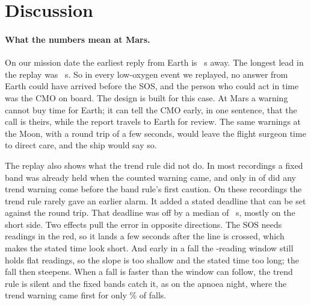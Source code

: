 \section{Discussion}\label{sec:discussion}

\paragraph{What the numbers mean at Mars.}
On our mission date the earliest reply from Earth is \numMarsRoundTripS~s away. The longest lead in the replay was \numUwMaxLeadS~s. So in every low-oxygen event we replayed, no answer from Earth could have arrived before the SOS, and the person who could act in time was the CMO on board. The design is built for this case. At Mars a warning cannot buy time for Earth; it can tell the CMO early, in one sentence, that the call is theirs, while the report travels to Earth for review. The same warnings at the Moon, with a round trip of a few seconds, would leave the flight surgeon time to direct care, and the ship would say so.

The replay also shows what the trend rule did not do. In most recordings a fixed band was already held when the counted warning came, and only in \numUwTrendBeforeCautionN{} of \numUwEvents{} did any trend warning come before the band rule's first caution. On these recordings the trend rule rarely gave an earlier alarm. It added a stated deadline that can be set against the round trip. That deadline was off by a median of \numUwPredAbsErrMedianS~s, mostly on the short side. Two effects pull the error in opposite directions. The SOS needs \numSustainN{} readings in the red, so it lands a few seconds after the line is crossed, which makes the stated time look short. And early in a fall the \numWindowN-reading window still holds flat readings, so the slope is too shallow and the stated time too long; the fall then steepens. When a fall is faster than the window can follow, the trend rule is silent and the fixed bands catch it, as on the apnoea night, where the trend warning came first for only \numApneaWarnedFirstPct\% of falls.

